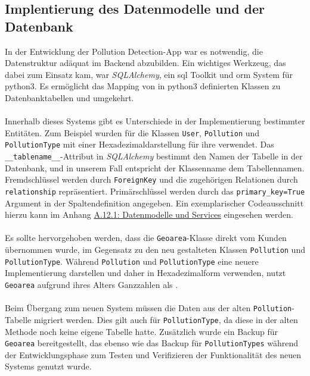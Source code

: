 \documentclass[a4paper,12pt]{article}
\begin{document}
\subsection{Implentierung des Datenmodelle und der Datenbank}
In der Entwicklung der \glqq Pollution Detection\grqq{}-App war es notwendig, die Datenstruktur adäquat im Backend abzubilden. Ein wichtiges Werkzeug, das dabei zum Einsatz kam, war \textit{SQLAlchemy}, ein \acrshort{sql} Toolkit und \gls{orm} System für \acrshort{python3}. Es ermöglicht das Mapping von in \acrshort{python3} definierten Klassen zu Datenbanktabellen und umgekehrt.\\
\\
Innerhalb dieses Systems gibt es Unterschiede in der Implementierung bestimmter Entitäten. Zum Beispiel wurden für die Klassen \texttt{User}, \texttt{Pollution} und \texttt{PollutionType}  mit einer Hexadezimaldarstellung für ihre  verwendet. Das \texttt{\_\_tablename\_\_}-Attribut in \textit{SQLAlchemy} bestimmt den Namen der Tabelle in der Datenbank, und in unserem Fall entspricht der Klassenname dem Tabellennamen. Fremdschlüssel werden durch \texttt{ForeignKey} und die zugehörigen Relationen durch \texttt{relationship} repräsentiert. Primärschlüssel werden durch das \texttt{primary\_key=True} Argument in der Spaltendefinition angegeben. Ein exemplarischer Codeausschnitt hierzu kann im Anhang \hyperref[lst:pollution]{A.12.1: Datenmodelle und Services} eingesehen werden.\\
\\
Es sollte hervorgehoben werden, dass die \texttt{Geoarea}-Klasse direkt vom Kunden übernommen wurde, im Gegensatz zu den neu gestalteten Klassen \texttt{Pollution} und \texttt{PollutionType}. Während \texttt{Pollution} und \texttt{Pollu\-tion\-Type}
 eine neuere Implementierung darstellen und daher  in Hexadezimalform verwenden, nutzt \texttt{Geoarea} aufgrund ihres Alters Ganzzahlen als .\\
\\
Beim Übergang zum neuen System müssen die Daten aus der alten \texttt{Pollution}-Tabelle migriert werden. Dies gilt auch für \texttt{PollutionType}, da diese in der alten Methode noch keine eigene Tabelle hatte. Zusätzlich wurde ein Backup für \texttt{Geoarea} bereitgestellt, das ebenso wie das Backup für \texttt{PollutionTypes} während der Entwicklungsphase zum Testen und Verifizieren der Funktionalität des neuen Systems genutzt wurde.
\end{document}
